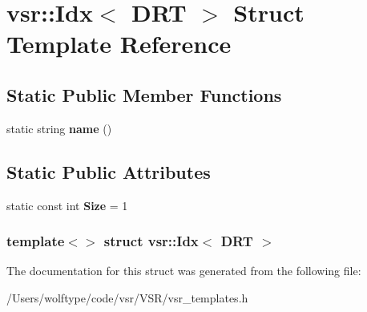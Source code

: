 \hypertarget{structvsr_1_1_idx_3_01_d_r_t_01_4}{\section{vsr\-:\-:Idx$<$ D\-R\-T $>$ Struct Template Reference}
\label{structvsr_1_1_idx_3_01_d_r_t_01_4}
}
\subsection*{Static Public Member Functions}
\begin{DoxyCompactItemize}
\item 
\hypertarget{structvsr_1_1_idx_3_01_d_r_t_01_4_a979d02339f9c17b85351ea197655d4f6}{static string {\bfseries name} ()}\label{structvsr_1_1_idx_3_01_d_r_t_01_4_a979d02339f9c17b85351ea197655d4f6}

\end{DoxyCompactItemize}
\subsection*{Static Public Attributes}
\begin{DoxyCompactItemize}
\item 
\hypertarget{structvsr_1_1_idx_3_01_d_r_t_01_4_ac6b829e75d6e88e05cf18e07f32d4543}{static const int {\bfseries Size} = 1}\label{structvsr_1_1_idx_3_01_d_r_t_01_4_ac6b829e75d6e88e05cf18e07f32d4543}

\end{DoxyCompactItemize}
\subsubsection*{template$<$$>$ struct vsr\-::\-Idx$<$ D\-R\-T $>$}



The documentation for this struct was generated from the following file\-:\begin{DoxyCompactItemize}
\item 
/\-Users/wolftype/code/vsr/\-V\-S\-R/vsr\-\_\-templates.\-h\end{DoxyCompactItemize}
